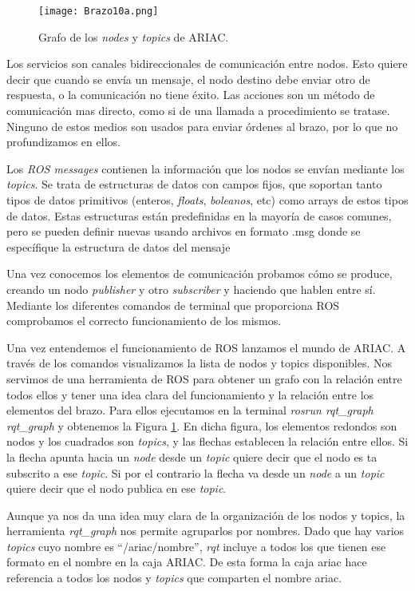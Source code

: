 \begin{figure}[]
	\centering\texttt{[image: Brazo10a.png]}
	\caption{Grafo de los \textit{nodes} y \textit{topics} de ARIAC.}
	\label{fig:ariacgraph1}
\end{figure}

Los servicios son canales bidireccionales de comunicación entre nodos. Esto quiere decir que cuando se envía un mensaje, el nodo destino debe enviar otro de respuesta, o la comunicación no tiene éxito. Las acciones son un método de comunicación mas directo, como si de una llamada a procedimiento se tratase. Ninguno de estos medios son usados para enviar órdenes al brazo, por lo que no profundizamos en ellos.

Los \textit{ROS messages} contienen la información que los nodos se envían mediante los \textit{topics}. Se trata de estructuras de datos con campos fijos, que soportan tanto tipos de datos primitivos (enteros, \textit{floats}, \textit{boleanos}, etc) como arrays de estos tipos de datos. Estas estructuras están predefinidas en la mayoría de casos comunes, pero se pueden definir nuevas usando archivos en formato .msg donde se específique la estructura de datos del mensaje

Una vez conocemos los elementos de comunicación probamos cómo se produce, creando un nodo \textit{publisher} y otro \textit{subscriber} y haciendo que hablen entre sí. Mediante los diferentes comandos de terminal que proporciona ROS comprobamos el correcto funcionamiento de los mismos. 

Una vez entendemos el funcionamiento de ROS lanzamos el mundo de ARIAC. A través de los comandos visualizamos la lista de nodos y topics disponibles. Nos servimos de una herramienta de ROS para obtener un grafo con la relación entre todos ellos y tener una idea clara del funcionamiento y la relación entre los elementos del brazo. Para ellos ejecutamos en la terminal \textit{rosrun rqt\_graph rqt\_graph} y obtenemos la Figura \ref{fig:ariacgraph1}. En dicha figura, los elementos redondos son nodos y los cuadrados son \textit{topics}, y las flechas establecen la relación entre ellos. Si la flecha apunta hacia un \textit{node} desde un \textit{topic} quiere decir que el nodo es ta subscrito a ese \textit{topic}. Si por el contrario la flecha va desde un \textit{node} a un \textit{topic} quiere decir que el nodo publica en ese \textit{topic}.

Aunque ya nos da una idea muy clara de la organización de los nodos y topics, la herramienta \textit{rqt\_graph} nos permite agruparlos por nombres. Dado que hay varios \textit{topics} cuyo nombre es \textquotedblleft /ariac/nombre\textquotedblright , \textit{rqt} incluye a todos los que tienen ese formato en el nombre en la caja ARIAC. De esta forma la caja ariac hace referencia a todos los nodos y \textit{topics} que comparten el nombre ariac.

